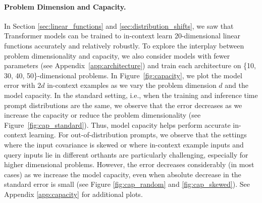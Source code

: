 \documentclass{article}
\begin{document}
\paragraph{Problem Dimension and Capacity.}
In Section \ref{sec:linear_functions} and \ref{sec:distribution_shifts}, we saw that Transformer models can be trained to in-context learn 20-dimensional linear functions accurately and relatively robustly. 
To explore the interplay between problem dimensionality and capacity, we also consider models with fewer parameters (see Appendix~\ref{app:architecture}) and train each architecture on \{10, 30, 40, 50\}-dimensional problems.
In Figure~\ref{fig:capacity}, we plot the model error with $2d$ in-context examples as we vary the problem dimension $d$ and the model capacity. 
In the standard setting, i.e., when the training and inference time prompt distributions are the same, we observe that the  error decreases as we increase the capacity or reduce the problem dimensionality (see Figure~\ref{fig:cap_standard}). 
Thus, model capacity helps perform accurate in-context learning.
For out-of-distribution prompts, we observe that the settings where the input covariance is skewed or where in-context example inputs and query inputs lie in different orthants are particularly challenging, especially for higher dimensional problems.
However, the error decreases considerably (in most cases) as we increase the model capacity, even when absolute decrease in the standard error is small (see Figure \ref{fig:cap_random} and \ref{fig:cap_skewed}). 
See Appendix \ref{app:capacity}  for additional plots.
\end{document}
